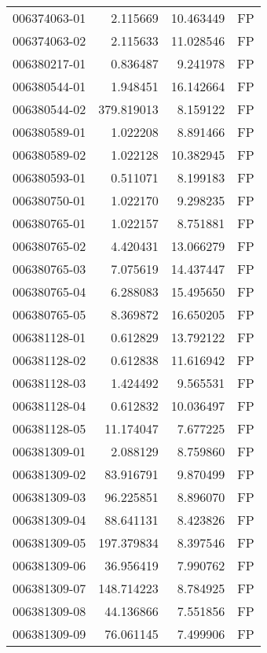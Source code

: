 \begin{tabular}{lrrl}
006374063-01 &    2.115669 &      10.463449 &   FP \\
006374063-02 &    2.115633 &      11.028546 &   FP \\
006380217-01 &    0.836487 &       9.241978 &   FP \\
006380544-01 &    1.948451 &      16.142664 &   FP \\
006380544-02 &  379.819013 &       8.159122 &   FP \\
006380589-01 &    1.022208 &       8.891466 &   FP \\
006380589-02 &    1.022128 &      10.382945 &   FP \\
006380593-01 &    0.511071 &       8.199183 &   FP \\
006380750-01 &    1.022170 &       9.298235 &   FP \\
006380765-01 &    1.022157 &       8.751881 &   FP \\
006380765-02 &    4.420431 &      13.066279 &   FP \\
006380765-03 &    7.075619 &      14.437447 &   FP \\
006380765-04 &    6.288083 &      15.495650 &   FP \\
006380765-05 &    8.369872 &      16.650205 &   FP \\
006381128-01 &    0.612829 &      13.792122 &   FP \\
006381128-02 &    0.612838 &      11.616942 &   FP \\
006381128-03 &    1.424492 &       9.565531 &   FP \\
006381128-04 &    0.612832 &      10.036497 &   FP \\
006381128-05 &   11.174047 &       7.677225 &   FP \\
006381309-01 &    2.088129 &       8.759860 &   FP \\
006381309-02 &   83.916791 &       9.870499 &   FP \\
006381309-03 &   96.225851 &       8.896070 &   FP \\
006381309-04 &   88.641131 &       8.423826 &   FP \\
006381309-05 &  197.379834 &       8.397546 &   FP \\
006381309-06 &   36.956419 &       7.990762 &   FP \\
006381309-07 &  148.714223 &       8.784925 &   FP \\
006381309-08 &   44.136866 &       7.551856 &   FP \\
006381309-09 &   76.061145 &       7.499906 &   FP \\

\end{tabular}
